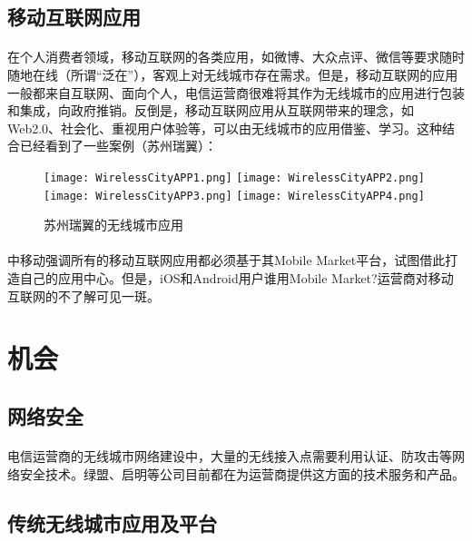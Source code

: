\documentclass[a4paper,14pt,openany]{article}
\begin{document}
\subsection{移动互联网应用}
\paragraph{}
在个人消费者领域，移动互联网的各类应用，如微博、大众点评、微信等要求随时随地在线（所谓“泛在”），客观上对无线城市存在需求。但是，移动互联网的应用一般都来自互联网、面向个人，电信运营商很难将其作为无线城市的应用进行包装和集成，向政府推销。反倒是，移动互联网应用从互联网带来的理念，如Web2.0、社会化、重视用户体验等，可以由无线城市的应用借鉴、学习。这种结合已经看到了一些案例（苏州瑞翼）：
\begin{figure}[htbp]
\small
\centering
\texttt{[image: WirelessCityAPP1.png]}
\texttt{[image: WirelessCityAPP2.png]}
\texttt{[image: WirelessCityAPP3.png]}
\texttt{[image: WirelessCityAPP4.png]}
\caption{苏州瑞翼的无线城市应用}
\label{fig:WirelessCityAPP}
\end{figure}

\paragraph{}
中移动强调所有的移动互联网应用都必须基于其Mobile Market平台，试图借此打造自己的应用中心。但是，iOS和Android用户谁用Mobile Market?运营商对移动互联网的不了解可见一斑。

\newpage
\section{机会}
\subsection{网络安全}
\paragraph{}
电信运营商的无线城市网络建设中，大量的无线接入点需要利用认证、防攻击等网络安全技术。绿盟、启明等公司目前都在为运营商提供这方面的技术服务和产品。
\subsection{传统无线城市应用及平台}
\end{document}
